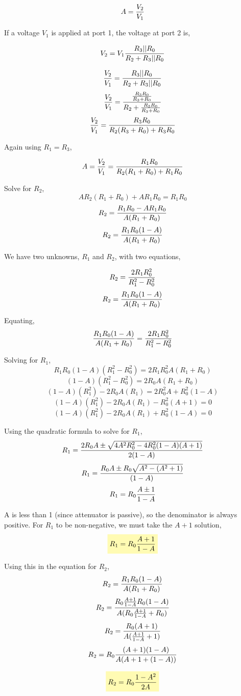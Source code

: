 \documentclass{article}
\begin{document}
\[A = {V_2 \over V_1} \]

If a voltage \(V_1\) is applied at port 1, the voltage at port 2 is,

\[V_2 = V_1 {R_3 || R_0 \over R_2 + R_3 || R_0} \]

\[{V_2 \over V_1}=  {R_3 || R_0 \over R_2 + R_3 || R_0} \]
\[{V_2 \over V_1}=  {{R_3 R_0 \over R_3 + R_0} \over R_2 + {R_3 R_0 \over R_3 + R_0} } \]
\[{V_2 \over V_1}=  {{R_3 R_0} \over R_2 (R_3 + R_0)+ {R_3 R_0} } \]

Again using \(R_1 = R_3\),

\[A = {V_2 \over V_1}=  {{R_1 R_0} \over R_2 (R_1 + R_0)+ {R_1 R_0} } \]

Solve for \(R_2\),
\[AR_2 (R_1 + R_0)+ A{R_1 R_0} = {{R_1 R_0}} \]
\[R_2 = {{R_1 R_0} - A{R_1 R_0} \over A(R_1 + R_0)}\]
\[R_2 = {{R_1 R_0}(1 - A) \over A(R_1 + R_0)}\]

We have two unknowns, \(R_1\) and \(R_2\), with two equations,

\[ R_2 =  { 2R_1 R_0^2 \over R_1^2  - R_0^2 } \]
\[R_2 = {{R_1 R_0}(1 - A) \over A(R_1 + R_0)}\]

Equating,
\[ {{R_1 R_0}(1 - A) \over A(R_1 + R_0)} =  { 2R_1 R_0^2 \over R_1^2  - R_0^2 } \]

Solving for \(R_1\),
\[ {{R_1 R_0}(1 - A) (R_1^2  - R_0^2 ) } =  { 2R_1 R_0^2 A(R_1 + R_0)} \]
\[ {(1 - A) (R_1^2  - R_0^2 ) } =  { 2R_0 A(R_1 + R_0)} \]
\[ {(1 - A) (R_1^2)} -2R_0 A(R_1) =  { 2R_0^2 A } + R_0^2(1 - A) \]
\[ {(1 - A) (R_1^2)} -2R_0 A(R_1) - R_0^2(A + 1) = 0\]
\[ {(1 - A) (R_1^2)} -2R_0 A(R_1) + R_0^2(1 - A) = 0\]


Using the quadratic formula to solve for \(R_1\),
\[R_1 = {{ 2 R_0 A} \pm \sqrt{  4A^2R_0^2 - 4 R_0^2 (1 - A) (A + 1)} \over 2(1 - A)} \]
\[R_1 = {{ R_0 A} \pm R_0 \sqrt{  A^2 - (A^2 + 1)} \over (1 - A)} \]
\[R_1 = R_0{{  A} \pm  1 \over 1 - A} \]

A is less than 1 (since attenuator is passive), so the denominator is always positive. For \(R_1\) to be non-negative, we must take the \(A +1\)
solution,
\[
\colorbox{yellow!30}{$\displaystyle R_1 = R_0{ A +  1 \over 1 - A} $}
\]

Using this in the equation for \(R_2\),
\[R_2 = {{R_1 R_0}(1 - A) \over A(R_1 + R_0)}\]
\[R_2 = {R_0{{ A +  1 \over 1 - A}  R_0}(1 - A) \over A(R_0{ A +  1 \over 1 - A}  + R_0)}\]
\[R_2 = {R_0 (A + 1)\over A({ A +  1 \over 1 - A}  + 1)}\]
\[R_2 = R_0{ (A + 1)(1 - A)\over A({ A +  1 }  + (1 - A))}\]

\[
\colorbox{yellow!30}{$\displaystyle  R_2 = {R_0 } { 1 - A^2 \over  2A}$}
\]
\end{document}
